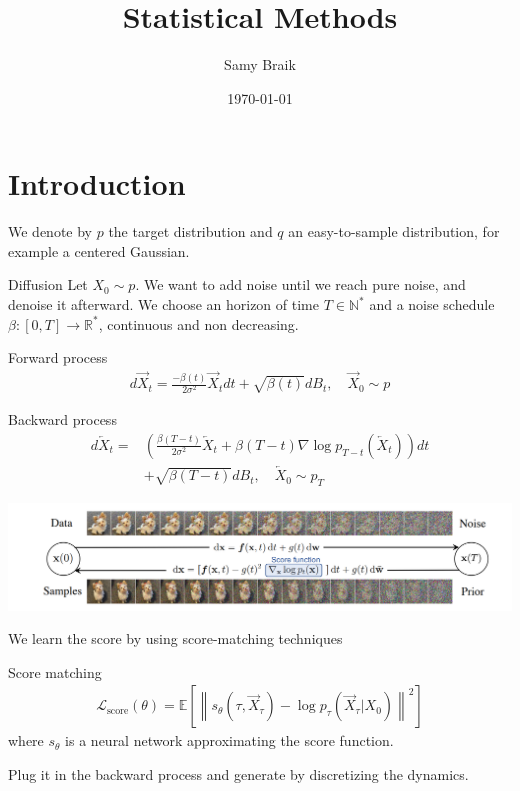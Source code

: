 \documentclass{beamer}
\title{Statistical Methods}
\author{Samy Braik}
\date{\today}
\begin{document}
\begin{frame}
    \titlepage
\end{frame}

\section{Introduction}

\begin{frame}
    We denote by \(p\) the target distribution and \(q\) an easy-to-sample distribution, for example a centered Gaussian.
\end{frame}

\begin{frame}{Diffusion}
    Let \(X_0\sim p\). We want to add noise until we reach pure noise, and denoise it afterward. We choose an horizon of time \(T\in\mathbb{N}^*\) and a noise schedule \(\beta:[0,T]\rightarrow\mathbb{R}^*\), continuous and non decreasing.

    \begin{block}{Forward process}
        \begin{align}
            d\overrightarrow{X}_t = \frac{-\beta(t)}{2\sigma^2}\overrightarrow{X}_t dt + \sqrt{\beta(t)}dB_t, \quad \overrightarrow{X}_0\sim p
        \end{align}
    \end{block}

    \begin{block}{Backward process}
        \begin{align}
            d\overleftarrow{X}_t=&\left(  \frac{\beta(T-t)}{2\sigma^2}\overleftarrow{X}_t+\beta(T-t)\nabla\log p_{T-t}\left(\overleftarrow{X}_t \right)  \right)dt \\ &+ \sqrt{\beta(T-t)}dB_t, \quad \overleftarrow{X}_0\sim p_T \nonumber
        \end{align}
            
    \end{block}
\end{frame}

\begin{frame}
    \includegraphics[width=1\linewidth]{score_based_dog.png}
    

    We learn the score by using score-matching techniques
    \begin{block}{Score matching}
        \begin{align}
            \mathcal{L}_\text{score}(\theta)=\mathbb{E}\left[ \left\| s_\theta \left(\tau,\overrightarrow{X}_\tau \right)-\log p_\tau \left(\overrightarrow{X}_\tau|X_0 \right)\right\|^2  \right]
        \end{align}
        where \(s_\theta\) is a neural network approximating the score function.
    \end{block}
    Plug it in the backward process and generate by discretizing the dynamics.
\end{frame}
\end{document}
